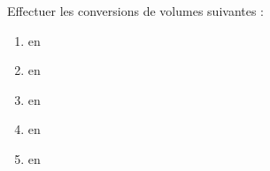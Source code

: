 \begin{exercice*}
   Effectuer les conversions de volumes suivantes :
   \begin{enumerate}
      \item {}       en \Vol[mm]{} 
      \item {}     en \Vol[cm]{} 
      \item {}    en \Vol[dam]{}
      \item {}  en \Vol[mm]{} 
      \item {}  en \Vol[km]{} 
   \end{enumerate}
\end{exercice*}